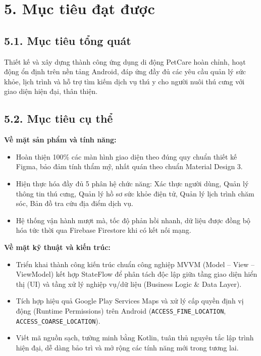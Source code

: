 \section*{5. Mục tiêu đạt được}

\subsection*{5.1. Mục tiêu tổng quát}
Thiết kế và xây dựng thành công ứng dụng di động PetCare hoàn chỉnh, hoạt động ổn định trên nền tảng Android, đáp ứng đầy đủ các yêu cầu quản lý sức khỏe, lịch trình và hỗ trợ tìm kiếm dịch vụ thú y cho người nuôi thú cưng với giao diện hiện đại, thân thiện.

\subsection*{5.2. Mục tiêu cụ thể}

\textbf{Về mặt sản phẩm và tính năng:}
\begin{itemize}
    \item Hoàn thiện 100\% các màn hình giao diện theo đúng quy chuẩn thiết kế Figma, bảo đảm tính thẩm mỹ, nhất quán theo chuẩn Material Design 3.
    \item Hiện thực hóa đầy đủ 5 phân hệ chức năng: Xác thực người dùng, Quản lý thông tin thú cưng, Quản lý hồ sơ sức khỏe điện tử, Quản lý lịch trình chăm sóc, Bản đồ tra cứu địa điểm dịch vụ.
    \item Hệ thống vận hành mượt mà, tốc độ phản hồi nhanh, dữ liệu được đồng bộ hóa tức thời qua Firebase Firestore khi có kết nối mạng.
\end{itemize}

\textbf{Về mặt kỹ thuật và kiến trúc:}
\begin{itemize}
    \item Triển khai thành công kiến trúc chuẩn công nghiệp MVVM (Model -- View -- ViewModel) kết hợp StateFlow để phân tách độc lập giữa tầng giao diện hiển thị (UI) và tầng xử lý nghiệp vụ/dữ liệu (Business Logic \& Data Layer).
    \item Tích hợp hiệu quả Google Play Services Maps và xử lý cấp quyền định vị động (Runtime Permissions) trên Android (\texttt{ACCESS\_FINE\_LOCATION}, \texttt{ACCESS\_COARSE\_LOCATION}).
    \item Viết mã nguồn sạch, tường minh bằng Kotlin, tuân thủ nguyên tắc lập trình hiện đại, dễ dàng bảo trì và mở rộng các tính năng mới trong tương lai.
\end{itemize}

